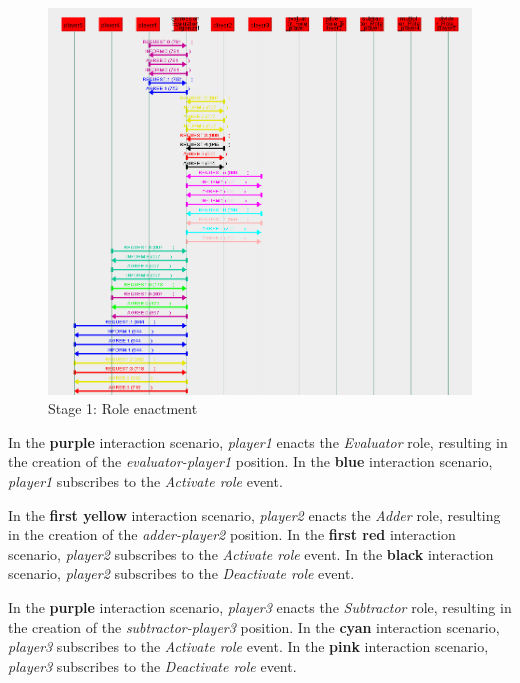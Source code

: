 \begin{figure}[H]
	\centering
	\includegraphics[width=\textwidth]{images/example2-stage1.png}
	\caption{Stage 1: Role enactment}
	\label{figure:example2-stage1}
\end{figure}

In the \textbf{purple} interaction scenario, \textit{player1} enacts the \textit{Evaluator} role, resulting in the creation of the \textit{evaluator-player1} position.
In the \textbf{blue} interaction scenario, \textit{player1} subscribes to the \textit{Activate role} event.

In the \textbf{first yellow} interaction scenario, \textit{player2} enacts the \textit{Adder} role, resulting in the creation of the \textit{adder-player2} position.
In the \textbf{first red} interaction scenario, \textit{player2} subscribes to the \textit{Activate role} event.
In the \textbf{black} interaction scenario, \textit{player2} subscribes to the \textit{Deactivate role} event.

In the \textbf{purple} interaction scenario, \textit{player3} enacts the \textit{Subtractor} role, resulting in the creation of the \textit{subtractor-player3} position.
In the \textbf{cyan} interaction scenario, \textit{player3} subscribes to the \textit{Activate role} event.
In the \textbf{pink} interaction scenario, \textit{player3} subscribes to the \textit{Deactivate role} event.

